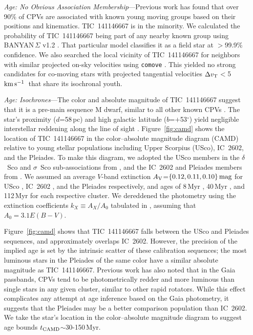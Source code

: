 \documentclass{nature3}
\newcommand{\kms}{\ensuremath{\rm km\,s^{-1}}}
\begin{document}
\begin{methods}
{\it Age: No Obvious Association Membership}---Previous work
\cite{Bouma2024} has found that over 90\% of CPVs are associated with
known young moving groups based on their positions and kinematics.
TIC~141146667 is in the minority.  We calculated the probability of
TIC~141146667 being part of any nearby known group using
BANYAN\,$\Sigma$ v1.2 \cite{Gagne2018}.  That particular model
classifies it as a field star at $>$99.9\% confidence.  We also
searched the local vicinity of TIC~141146667 for neighbors with
similar projected on-sky velocities using \texttt{comove}
\cite{Tofflemire2021}.  This yielded no strong candidates for
co-moving stars with projected tangential velocities $\Delta v_{\rm
T}$$<$5\,\kms\ that share its isochronal youth.

{\it Age: Isochrones}---The color and absolute magnitude of
TIC~141146667 suggest that it is a pre-main sequence M dwarf, similar to
all other known CPVs \cite{Stauffer2017,Stauffer2021,Bouma2024}.  The
star's proximity ($d$=58\,pc) and high galactic latitude
($b$=$+$53$^\circ$) yield negligible interstellar reddening along the
line of sight \cite{Green2019}.  Figure~\ref{fig:camd} shows the
location of TIC~141146667 in the color--absolute magnitude diagram
(CAMD) relative to young stellar populations including Upper Scorpius
(USco), IC~2602, and the Pleiades.  To make this diagram, we adopted
the USco members in the $\delta$~Sco and $\sigma$~Sco sub-associations
from \cite{Ratzenbock2023}, and the IC~2602 and Pleiades members from
\cite{Hunt2024}.  We assumed an average $V$-band extinction $A_{\rm
V}$=$\{0.12, 0.11, 0.10\}\,{\rm mag}$ for USco \cite{Pecaut2016},
IC~2602 \cite{Hunt2024}, and the Pleiades \cite{Hunt2024}
respectively, and ages of 8\,Myr \cite{Ratzenbock2023}, 40\,Myr
\cite{Randich2018}, and 112\,Myr \cite{Dahm2015} for each respective
cluster.  We dereddened the photometry using the extinction
coefficients $k_X\equiv A_X/A_0$ tabulated in
\cite{GaiaCollaboration2018}, assuming that $A_0 = 3.1 E(B-V)$.

Figure~\ref{fig:camd} shows that TIC~141146667 falls between the USco
and Pleiades sequences, and approximately overlaps IC~2602.  However,
the precision of the implied age is set by the intrinsic scatter of
these calibration sequences; the most luminous stars in the Pleiades of
the same color have a similar absolute magnitude as TIC~141146667.
Previous work \cite{Stauffer2021} has also noted that in the Gaia
passbands, CPVs tend to be photometrically redder and more luminous than
single stars in any given cluster, similar to other rapid rotators.
While this effect complicates any attempt at age inference based on the
Gaia photometry, it suggests that the Pleiades may be a better
comparison population than IC~2602.  We take the star's
location in the color--absolute magnitude diagram to suggest age bounds
$t_{\rm CAMD}$$\sim$30-150\,Myr.



\end{methods}
\end{document}
